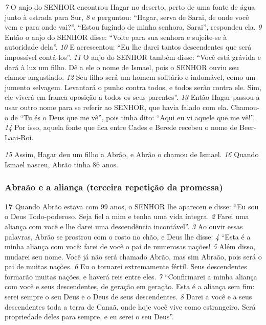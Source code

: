 \bigskip
\textit{\tiny 7}
O anjo do SENHOR encontrou Hagar no deserto, perto de uma fonte de água
junto à estrada para Sur, 
\textit{\tiny 8}
e perguntou: “Hagar, serva de Sarai, de onde você vem e
para onde vai?”.
   “Estou fugindo de minha senhora, Sarai”, respondeu ela.
\textit{\tiny 9}
Então o anjo do SENHOR disse: “Volte para sua senhora e sujeite-se à autoridade
dela”. 
\textit{\tiny 10}
E acrescentou: “Eu lhe darei tantos descendentes que será impossível contá-los”.
\textit{\tiny 11}
O anjo do SENHOR também disse: “Você está grávida e dará à luz um filho. Dê
a ele o nome de Ismael, pois o SENHOR ouviu seu clamor angustiado. 
\textit{\tiny 12}
Seu filho
será um homem solitário e indomável, como um jumento selvagem. Levantará o
punho contra todos, e todos serão contra ele. Sim, ele viverá em franca oposição a
todos os seus parentes”.   
\textit{\tiny 13}
Então Hagar passou a usar outro nome para se referir ao SENHOR, que havia
falado com ela. Chamou-o de “Tu és o Deus que me vê”, pois tinha dito: “Aqui eu
vi aquele que me vê!”. 
\textit{\tiny 14}
Por isso, aquela fonte que fica entre Cades e Berede
recebeu o nome de Beer-Laai-Roi.   

\bigskip
\textit{\tiny 15}
Assim, Hagar deu um filho a Abrão, e Abrão o chamou de Ismael. 
\textit{\tiny 16}
Quando
Ismael nasceu, Abrão tinha 86 anos.

\bigskip
\subsubsection*{Abraão e a aliança (terceira repetição da promessa)}
\textbf{\large 17}
 Quando Abrão estava com 99 anos, o SENHOR lhe apareceu e disse: “Eu sou
o Deus Todo-poderoso. Seja fiel a mim e tenha uma vida íntegra. 
\textit{\tiny 2}
Farei uma
aliança com você e lhe darei uma descendência incontável”.
\textit{\tiny 3}
Ao ouvir essas palavras, Abrão se prostrou com o rosto no chão, e Deus lhe
disse: 
\textit{\tiny 4}
“Esta é a minha aliança com você: farei de você o pai de numerosas nações!
\textit{\tiny 5}
Além disso, mudarei seu nome. Você já não será chamado Abrão, mas sim
Abraão, pois será o pai de muitas nações. 
\textit{\tiny 6}
Eu o tornarei extremamente fértil.
Seus descendentes formarão muitas nações, e haverá reis entre eles.
\textit{\tiny 7}
“Confirmarei a minha aliança com você e seus descendentes, de geração em
geração. Esta é a aliança sem fim: serei sempre o seu Deus e o Deus de seus
descendentes. 
\textit{\tiny 8}
Darei a você e a seus descendentes toda a terra de Canaã, onde
hoje você vive como estrangeiro. Será propriedade deles para sempre, e eu serei o
seu Deus”.


